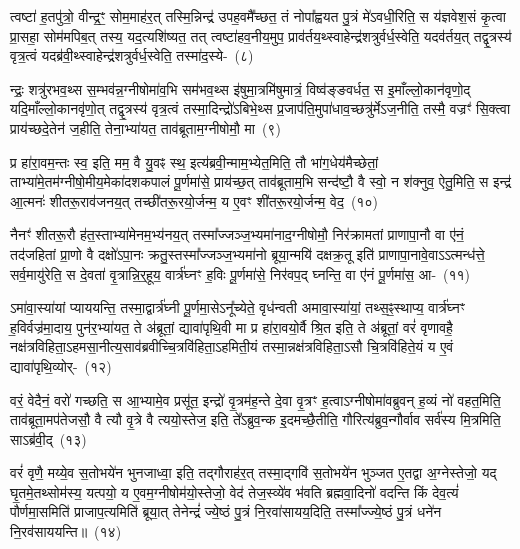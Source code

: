 त्वष्टा॑ ह॒तपु॑त्रो॒ वीन्द्र॒ꣳ॒ सोम॒माह॑र॒त् तस्मि॒न्निन्द्र॑ उपह॒वमै᳚च्छत॒ तं नोपा᳚ह्वयत पु॒त्रं मे॑\-ऽवधी॒रिति॒ स य॑ज्ञवेश॒सं कृ॒त्वा प्रा॒सहा॒ सोम॑मपिब॒त् तस्य॒ यद॒त्यशि॑ष्यत॒ तत् त्वष्टा॑हव॒नीय॒मुप॒ प्राव॑र्तय॒थ्\-स्वाहेन्द्र॑शत्रुर्वर्ध॒स्वेति॒ यदव॑र्तय॒त् तद्वृ॒त्रस्य॑ वृत्र॒त्वं यदब्र॑वी॒थ्\-स्वाहेन्द्र॑शत्रुर्वर्ध॒स्वेति॒ तस्मा॑द॒स्ये-~(८)\ip

न्द्रः॒ शत्रु॑रभव॒थ्स स॒म्भव॑न्न॒ग्नी\-षोमा॑व॒भि सम॑भव॒थ्स इ॑षुमा॒त्रमि॑षुमात्रं॒ विष्व॑ङ्ङवर्धत॒ स इ॒माँल्लो॒कान॑वृणो॒द् यदि॒माँल्लो॒का\-नवृ॑णो॒त् तद्वृ॒त्रस्य॑ वृत्र॒त्वं तस्मा॒दिन्द्रो॑\-ऽबिभे॒थ्स प्र॒जा\-प॑ति॒मुपा॑\-धाव॒च्छत्रु॑र्मे\-ऽज॒नीति॒ तस्मै॒ वज्रꣳ॑ सि॒क्त्वा प्राय॑च्छदे॒तेन॑ ज॒हीति॒ तेना॒भ्या॑यत॒ ताव॑ब्रूताम॒ग्नी\-षोमौ॒ मा~(९)\ip

प्र हा॑रा॒वम॒न्तः स्व॒ इति॒ मम॒ वै यु॒वꣴ स्थ॒ इत्य॑ब्रवी॒न्माम॒भ्ये\-त॒मिति॒ तौ भा॑ग॒धेय॑मैच्छेतां॒ ताभ्या॑मे॒त\-म॑ग्नीषो॒मीय॒\-मेका॑\-दश\-कपालं पू॒र्णमा॑से॒ प्राय॑च्छ॒त् ताव॑ब्रूताम॒भि सन्द॑ष्टौ॒ वै स्वो॒ न श॑क्नुव॒ ऐतु॒मिति॒ स इन्द्र॑ आ॒त्मनः॑ शीतरू॒राव॑जनय॒त् तच्छी॑तरू॒रयो॒र्जन्म॒ य ए॒वꣳ शी॑तरू॒रयो॒र्जन्म॒ वेद॒~(१०)\ip


नैनꣳ॑ शीतरू॒रौ ह॑त॒स्ताभ्या॑मेनम॒भ्य॑नय॒त् तस्मा᳚ज्जञ्ज॒भ्यमा॑\-नाद॒ग्नी\-षोमौ॒ निर॑क्रामतां प्राणापा॒नौ वा ए॑नं॒ तद॑जहितां प्रा॒णो वै दक्षो॑\-ऽपा॒नः क्रतु॒स्तस्मा᳚ज्जञ्ज॒भ्यमा॑नो ब्रूया॒न्मयि॑ दक्षक्र॒तू इति॑ प्राणापा॒नावे॒वा\-ऽऽ\-त्मन्ध॑त्ते॒ सर्व॒मायु॑रेति॒ स दे॒वता॑ वृ॒त्रान्नि॒र्॒\mbox{}हूय॒ वार्त्र॑घ्नꣳ ह॒विः पू॒र्णमा॑से॒ निर॑वप॒द् घ्नन्ति॒ वा ए॑नं पू॒र्णमा॑स॒ आ-~(११)\ip

ऽमा॑वा॒स्या॑यां प्याययन्ति॒ तस्मा॒द्वार्त्र॑घ्नी पू॒र्णमा॒से\-ऽनू᳚च्येते॒ वृध॑न्वती अमावा॒स्या॑यां॒ तथ्स॒ꣴ॒स्थाप्य॒ वार्त्र॑घ्नꣳ ह॒विर्वज्र॑मा॒दाय॒ पुन॑र॒भ्या॑यत॒ ते अ॑ब्रूतां॒ द्यावा॑\-पृथि॒वी मा प्र हा॑रा॒वयो॒र्वै श्रि॒त इति॒ ते अ॑ब्रूतां॒ वरं॑ वृणावहै॒ नक्ष॑त्रविहिता॒\-ऽहमसा॒नीत्य॒साव॑ब्रवीच्चि॒त्रवि॑हिता॒\-ऽहमिती॒यं तस्मा॒न्नक्ष॑त्रविहिता॒\-ऽसौ चि॒त्रवि॑हिते॒यं य ए॒वं द्यावा॑पृथि॒व्योर्-~(१२)\ip

वरं॒ वेदैनं॒ वरो॑ गच्छति॒ स आ॒भ्यामे॒व प्रसू॑त॒ इन्द्रो॑ वृ॒त्रम॑ह॒न्ते दे॒वा वृ॒त्रꣳ ह॒त्वा\-ऽग्नी\-षोमा॑वब्रुवन् ह॒व्यं नो॑ वहत॒मिति॒ ताव॑ब्रूता॒मप॑तेजसौ॒ वै त्यौ वृ॒त्रे वै त्ययो॒स्तेज॒ इति॒ ते᳚\-ऽब्रुव॒न्क इ॒दमच्छै॒तीति॒ गौरित्य॑ब्रुव॒न्गौर्वाव सर्व॑स्य मि॒त्रमिति॒ सा\-ऽब्र॑वी॒द्~(१३)\ip

वरं॑ वृणै॒ मय्ये॒व स॒तोभये॑न भुनजाध्वा॒ इति॒ तद्गौराह॑र॒त् तस्मा॒द्गवि॑ स॒तोभये॑न भुञ्जत ए॒तद्वा अ॒ग्नेस्तेजो॒ यद् घृ॒तमे॒तथ्सोम॑स्य॒ यत्पयो॒ य ए॒वम॒ग्नी\-षोम॑यो॒स्तेजो॒ वेद॑ तेज॒स्व्ये॑व भ॑वति ब्रह्मवा॒दिनो॑ वदन्ति किं देव॒त्यं॑ पौर्णमा॒समिति॑ प्राजाप॒त्यमिति॑ ब्रूया॒त् तेनेन्द्रं॑ ज्ये॒ष्ठं पु॒त्रं नि॒रवा॑सायय॒दिति॒ तस्मा᳚ज्ज्ये॒ष्ठं पु॒त्रं धने॑न नि॒रव॑साययन्ति॥~(१४)\ip

